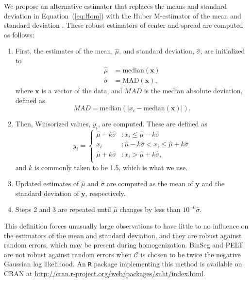 \documentclass[12pt]{article}
\def\ni{\noindent}
\begin{document}
\begin{doublespacing}
We propose an alternative estimator that replaces the means and standard deviation in Equation~(\ref{eq:Hom}) with the Huber M-estimator of the mean and standard deviation \cite{huber11}.  These robust estimators of center and spread are computed as follows:
\begin{enumerate}
	\item First, the estimates of the mean, $\hat{\mu}$, and standard deviation, $\hat{\sigma}$, are initialized to
	\begin{align*}
		\hat{\mu} &= \mbox{median}(\mathbf{x})\\
		\hat{\sigma} &= \mbox{MAD}(\mathbf{x}),
	\end{align*}
	where $\mathbf{x}$ is a vector of the data, and $MAD$ is the median absolute deviation, defined as
	\begin{equation*}
		MAD = \mbox{median}( \lvert x_i - \mbox{median}(\mathbf{x}) \rvert ).
	\end{equation*}
	\item Then, Winsorized values, $y_i$, are computed.  These are defined as
	\begin{equation*}
		y_i = \left\{ \begin{array}{ll}
			\hat{\mu}-k \hat{\sigma} & : x_i \leq \hat{\mu}-k \hat{\sigma}\\
			x_i & : \hat{\mu}-k \hat{\sigma} < x_i \leq \hat{\mu}+k \hat{\sigma}\\
			\hat{\mu}+k \hat{\sigma} & : x_i > \hat{\mu}+k \hat{\sigma},\\
		\end{array} \right.
	\end{equation*}
	and $k$ is commonly taken to be 1.5, which is what we use.
	\item Updated estimates of $\hat{\mu}$ and $\hat{\sigma}$ are computed as the mean of $\mathbf{y}$ and the standard deviation of $\mathbf{y}$, respectively.
	\item Steps 2 and 3 are repeated until $\hat{\mu}$ changes by less than $10^{-6} \hat{\sigma}$.
\end{enumerate}

\ni This definition forces unusually large observations to have little to no influence on the estimators of the mean and standard deviation, and they are robust against random errors, which may be present during homogenization.  BinSeg and PELT are not robust against random errors when $\mathcal{C}$ is chosen to be twice the negative Gaussian log likelihood.  An \texttt{R} package implementing this method is available on CRAN at \url{http://cran.r-project.org/web/packages/snht/index.html}.


\end{doublespacing}
\end{document}
